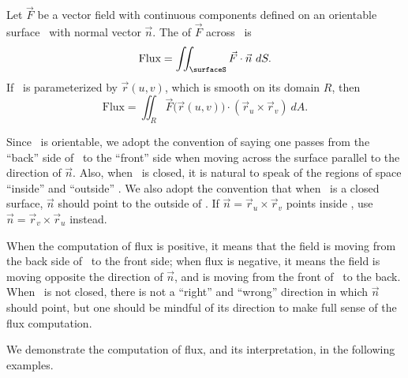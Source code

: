 \begin{definition}\label{def:surfflux}
Let $\vec F$ be a vector field with continuous components defined on an orientable surface \surfaceS\ with normal vector $\vec n$. The  of $\vec F$ across \surfaceS\ is
\[\text{Flux} = \iint_\surfaceS \vec F\cdot \vec n\ dS.\]
If \surfaceS\ is parameterized by $\vec r(u,v)$, which is smooth on its domain $R$, then
\[
\text{Flux} = \iint_R \vec F\big(\vec r(u,v)\big)\cdot (\vec r_u\times \vec r_v)\ dA.
\]
\end{definition}

Since \surfaceS\ is orientable, we adopt the convention of saying one passes from the ``back'' side of \surfaceS\ to the ``front'' side when moving across the surface parallel to the direction of $\vec n$. Also, when \surfaceS\ is closed, it is natural to speak of the regions of space ``inside'' and ``outside'' \surfaceS. We also adopt the convention that when \surfaceS\ is a closed surface, $\vec n$ should point to the outside of \surfaceS. If $\vec n = \vec r_u\times\vec r_v$ points inside \surfaceS, use $\vec n = \vec r_v\times \vec r_u$ instead.

When the computation of flux is positive, it means that the field is moving from the back side of \surfaceS\ to the front side; when flux is negative, it means the field is moving opposite the direction of $\vec n$, and is moving from the front of \surfaceS\ to the back. When \surfaceS\ is not closed, there is not a ``right'' and ``wrong'' direction in which $\vec n$ should point, but one should be mindful of its direction to make full sense of the flux computation.

We demonstrate the computation of flux, and its interpretation, in the following examples.


